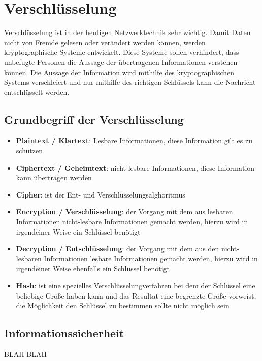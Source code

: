 \section{Verschlüsselung}

Verschlüsselung ist in der heutigen Netzwerktechnik sehr wichtig. Damit Daten nicht von Fremde gelesen oder verändert werden können, werden kryptographische Systeme entwickelt. Diese Systeme sollen verhindert, dass unbefugte Personen die Aussage der übertragenen Informationen verstehen können. Die Aussage der Information wird mithilfe des kryptographischen Systems verschleiert und nur mithilfe des richtigen Schlüssels kann die Nachricht entschlüsselt werden.\\

\subsection{Grundbegriff der Verschlüsselung}

\begin{itemize}
\item \textbf{Plaintext / Klartext}: Lesbare Informationen, diese Information gilt es zu schützen
\item \textbf{Ciphertext / Geheimtext}: nicht-lesbare Informationen, diese Information kann übertragen werden
\item \textbf{Cipher}: ist der Ent- und Verschlüsselungsalghoritmus
\item \textbf{Encryption / Verschlüsselung}: der Vorgang mit dem aus lesbaren Informationen nicht-lesbare Informationen gemacht werden, hierzu wird in irgendeiner Weise ein Schlüssel benötigt
\item \textbf{Decryption / Entschlüsselung}: der Vorgang mit dem aus den nicht-lesbaren Informationen lesbare Informationen gemacht werden, hierzu wird in irgendeiner Weise ebenfalls ein Schlüssel benötigt
\item \textbf{Hash}: ist eine spezielles Verschlüsselungverfahren bei dem der Schlüssel eine beliebige Größe haben kann und das Resultat eine begrenzte Größe vorweist, die Möglichkeit den Schlüssel zu bestimmen sollte nicht möglich sein
\end{itemize}

\subsection{Informationssicherheit}

BLAH BLAH

